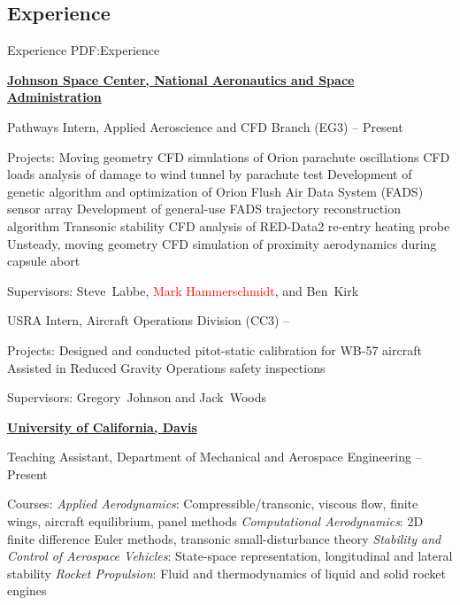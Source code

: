 \documentclass[letterpaper,MMMyyyy,nonstop]{simpleresumecv}
\begin{document}
\begin{body}

\section
{Experience}
{Experience}
{PDF:Experience}

\href{https://www.nasa.gov/centers/johnson/home/index.html}
{\textbf{Johnson Space Center,
National Aeronautics and Space Administration}}

\GapNoBreak
\BulletItem
Pathways Intern, Applied Aeroscience and CFD Branch (EG3)
\hfill
{} --
Present
\begin{detail}
\SubItem
Projects:
\SubBulletItem
Moving geometry CFD simulations of Orion parachute oscillations
\SubBulletItem
CFD loads analysis of damage to wind tunnel by parachute test
\SubBulletItem
Development of genetic algorithm and optimization of Orion Flush Air Data System (FADS) sensor array
\SubBulletItem
Development of general-use FADS trajectory reconstruction algorithm
\SubBulletItem
Transonic stability CFD analysis of RED-Data2 re-entry heating probe
\SubBulletItem
Unsteady, moving geometry CFD simulation of proximity aerodynamics during capsule abort


\SubItem
Supervisors:
Steve~Labbe, \textcolor{red}{Mark Hammerschmidt}, and
Ben~Kirk
\end{detail}

\GapNoBreak
\BulletItem
USRA Intern, Aircraft Operations Division (CC3)
\hfill
{} --
\begin{detail}
\SubItem
Projects:
\SubBulletItem
Designed and conducted pitot-static calibration for WB-57 aircraft
\SubBulletItem
Assisted in Reduced Gravity Operations safety inspections

\SubItem
Supervisors:
Gregory~Johnson and
Jack~Woods
\end{detail}


\Gap

\href{http://mae.ucdavis.edu/}
{\textbf{University of California, Davis}}

\GapNoBreak
\BulletItem
Teaching Assistant, Department of Mechanical and Aerospace Engineering
\hfill
{} --
Present
\begin{detail}
\SubItem
Courses:
\SubBulletItem
\emph{Applied Aerodynamics}:  Compressible/transonic, viscous flow, finite wings, aircraft equilibrium, panel methods
\SubBulletItem
\emph{Computational Aerodynamics}:  2D finite difference Euler methods, transonic small-disturbance theory
\SubBulletItem
\emph{Stability and Control of Aerospace Vehicles}:  State-space representation, longitudinal and lateral stability
\SubBulletItem
\emph{Rocket Propulsion}:  Fluid and thermodynamics of liquid and solid rocket engines


\end{detail}
\end{body}
\end{document}
